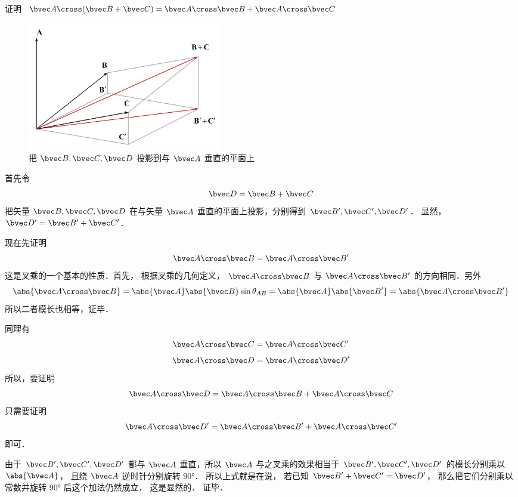 
证明 $\bvec A \cross (\bvec B + \bvec C) = \bvec A \cross \bvec B + \bvec A \cross \bvec C$ 

\begin{figure}[ht]
\vskip-10pt
\centering
\includegraphics[width=8.5cm]{./figures/CrossP1.pdf}
\caption{把 $\bvec B,\bvec C,\bvec D$ 投影到与 $\bvec A$ 垂直的平面上}
\end{figure}

首先令
\begin{equation}
\bvec D = \bvec B + \bvec C
\end{equation}
把矢量 $\bvec B,\bvec C,\bvec D$ 在与矢量 $\bvec A$ 垂直的平面上投影，分别得到 $\bvec B',\bvec C',\bvec D'$． 显然，$\bvec D'=\bvec B'+\bvec C'$． 

现在先证明
\begin{equation}
\bvec A \cross \bvec B = \bvec A \cross \bvec B'
\end{equation} 
这是叉乘的一个基本的性质．首先，
根据叉乘的几何定义， $\bvec A \cross \bvec B$ 与
 $\bvec A \cross \bvec B'$ 的方向相同．另外
\begin{equation}
\abs{\bvec A \cross \bvec B}  = \abs{\bvec A} \abs{\bvec B} \sin{\theta_{AB}} = \abs{\bvec A} \abs{\bvec B'}=\abs{\bvec A \cross \bvec B'}
\end{equation}
所以二者模长也相等，证毕．

同理有 
\begin{equation}
\bvec A \cross \bvec C = \bvec A \cross \bvec C'
\end{equation}
\begin{equation}
\bvec A \cross \bvec D = \bvec A \cross \bvec D'
\end{equation}
所以，要证明
\begin{equation}
\bvec A \cross \bvec D = \bvec A \cross \bvec B + \bvec A \cross \bvec C
\end{equation}
只需要证明
\begin{equation}
\bvec A \cross \bvec D' = \bvec A \cross \bvec B' + \bvec A \cross \bvec C'
\end{equation}
即可．

由于 $\bvec B', \bvec C', \bvec D'$ 都与 $\bvec A$ 垂直，所以 $\bvec A$ 与之叉乘的效果相当于 $\bvec B', \bvec C', \bvec D'$ 的模长分别乘以 $\abs {\bvec A}$， 且绕 $\bvec A$ 逆时针分别旋转 $90°$． 所以上式就是在说， 若已知 $\bvec B' + \bvec C' = \bvec D'$， 那么把它们分别乘以常数并旋转 $90°$ 后这个加法仍然成立． 这是显然的． 证毕．
